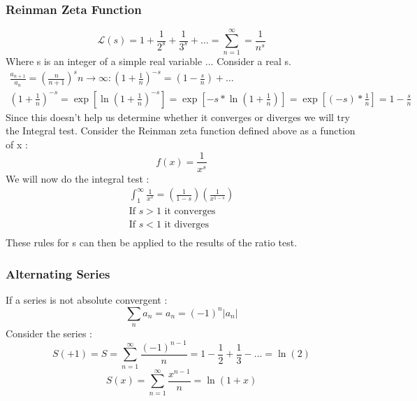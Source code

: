 \documentclass{article}
\newcommand{\be}{\begin{equation}}
\newcommand{\ee}{\end{equation}}
\begin{document}
\subsubsection*{Reinman Zeta Function}
\be
\mathcal{L}(s) = 1 + \frac{1}{2^s} + \frac{1}{3^s}+ \hdots = \sum_{n=1}^{\infty} = \frac{1}{n^s}
\ee
Where s is an integer of a simple real variable ...
Consider a real s.
\be
\begin{split}
\frac{a_{n+1}}{a_n}= \left(\frac{n}{n+1}\right)^s {n \to \infty}:  \left(1+\frac{1}{n}\right)^{-s} = \left( 1 - \frac{s}{n}\right)+ \hdots \\
\left(1 + \frac{1}{n}\right)^{-s} = \exp\left[{\ln{\left(1+\frac{1}{n}\right)^{-s}}}\right] = \exp\left[-s*{\ln{\left(1+\frac{1}{n}\right)^{}}}\right] = \exp\left[(-s)*\frac{1}{n}\right]=1 - \frac{s}{n}
\end{split}
\ee
Since this doesn't help us determine whether it converges or diverges we will try the Integral test.
Consider the Reinman zeta function defined above as a function of x :
\be
f(x) = \frac{1}{x^s}
\ee
We will now do the integral test :
\be
\begin{split}
    \int_1^\infty \frac{1}{x^s} = \left(\frac{1}{1-s}\right)\left(\frac{1}{x^{1-s}}\right) \\
    \text{If } s>1  \text{ it converges} \\
    \text{If } s<1 \text{ it diverges} \\
\end{split}
\ee
These rules for s can then be applied to the results of the ratio test.
\subsubsection*{Alternating Series}
If a series is not absolute convergent :
\be
\sum_n a_n = a_n = (-1)^n |a_n|
\ee
Consider  the series :
\be
S(+1) = S = \sum_{n=1}^\infty \frac{(-1)^{n-1}}{n} = 1 - \frac{1}{2} + \frac{1}{3} - \hdots = \ln(2)
\ee
\be
S(x) = \sum_{n=1}^\infty \frac{x^{n-1}}{n} = \ln(1+x)
\ee
\end{document}
